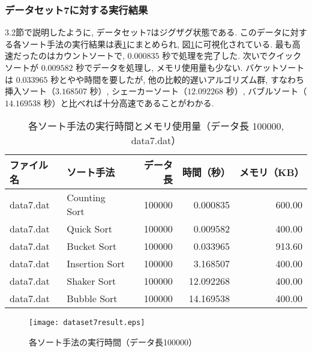 \documentclass[a4j, 11pt]{jarticle}
\begin{document}
\subsubsection{データセット7に対する実行結果}
3.2節で説明したように, データセット7はジグザグ状態である. このデータに対する各ソート手法の実行結果は表\ref{dataset7allresult}にまとめられ, 図\ref{dataset7allresultgraph}に可視化されている. 最も高速だったのはカウントソートで, $0.000835$ 秒で処理を完了した. 次いでクイックソートが $0.009582$ 秒でデータを処理し, メモリ使用量も少ない. バケットソートは $0.033965$ 秒とやや時間を要したが, 他の比較的遅いアルゴリズム群, すなわち挿入ソート（$3.168507$ 秒）, シェーカーソート（$12.092268$ 秒）, バブルソート（$14.169538$ 秒）と比べれば十分高速であることがわかる. 
\begin{table}[H]
  \centering
  \caption{各ソート手法の実行時間とメモリ使用量（データ長 100000, data7.dat）}\label{dataset7allresult}
  \begin{tabular}{|l|l|r|r|r|}
    \hline
    \textbf{ファイル名} & \textbf{ソート手法} & \textbf{データ長} & \textbf{時間（秒）} & \textbf{メモリ（KB）} \\
    \hline
    data7.dat & Counting Sort  & 100000 & 0.000835  & 600.00 \\
    data7.dat & Quick Sort     & 100000 & 0.009582  & 400.00 \\
    data7.dat & Bucket Sort    & 100000 & 0.033965  & 913.60 \\
    data7.dat & Insertion Sort & 100000 & 3.168507  & 400.00 \\
    data7.dat & Shaker Sort    & 100000 & 12.092268 & 400.00 \\
    data7.dat & Bubble Sort    & 100000 & 14.169538 & 400.00 \\
    \hline
  \end{tabular}
\end{table}
\begin{figure}[H]
  \centering
  \texttt{[image: dataset7result.eps]}
  \caption{各ソート手法の実行時間（データ長100000）}\label{dataset7allresultgraph}
\end{figure}
\newpage
\end{document}
